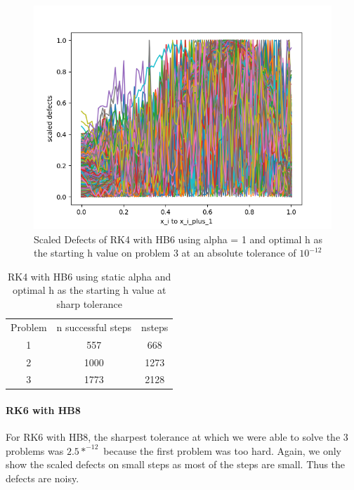 \documentclass{article}
\begin{document}
\begin{figure}[H]
\centering
\includegraphics[width=0.7\linewidth]{./figures/sharp_tolerance_rk4_with_hb6_p3_scaled_defects}
\caption{Scaled Defects of RK4 with HB6 using alpha = 1 and optimal h as the starting h value on problem 3 at an absolute tolerance of $10^{-12}$}
\label{fig:sharp_tolerance_rk4_with_hb6_p3_scaled_defects}
\end{figure}

\begin{table}[h]
\caption {RK4 with HB6 using static alpha and optimal h as the starting h value at sharp tolerance} \label{tab:rk4_with_hb6_sharp_tolerance}
\begin{center}
\begin{tabular}{ c c c } 
Problem & n successful steps      &       nsteps \\ 
1       & 557                     &        668   \\ 
2       & 1000                    &        1273  \\
3       & 1773                    &        2128  \\
\end{tabular}
\end{center}
\end{table}	


\paragraph{RK6 with HB8}
For RK6 with HB8, the sharpest tolerance at which we were able to solve the 3 problems was $2.5*^{-12}$ because the first problem was too hard. Again, we only show the scaled defects on small steps as most of the steps are small. Thus the defects are noisy.
\end{document}
